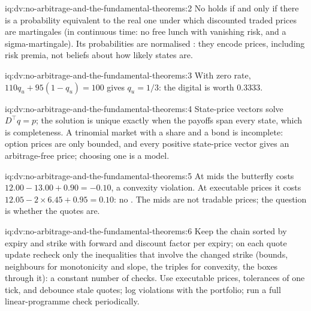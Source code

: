 \begin{solution}{iq:dv:no-arbitrage-and-the-fundamental-theorems:2}
No  holds if and only if there is a probability equivalent to the real one
under which discounted traded prices are martingales (in continuous time: no free
lunch with vanishing risk, and a sigma-martingale). Its probabilities are
normalised : they encode prices, including risk premia, not beliefs
about how likely states are.
\end{solution}

\begin{solution}{iq:dv:no-arbitrage-and-the-fundamental-theorems:3}
With zero rate, $110q_u+95(1-q_u)=100$ gives $q_u=1/3$: the digital is worth 0.3333.
\end{solution}

\begin{solution}{iq:dv:no-arbitrage-and-the-fundamental-theorems:4}
State-price vectors solve $D^\top q=p$; the solution is unique exactly when the
payoffs span every state, which is completeness. A trinomial market with a share
and a bond is incomplete: option prices are only bounded, and every positive
state-price vector gives an arbitrage-free price; choosing one is a model.
\end{solution}

\begin{solution}{iq:dv:no-arbitrage-and-the-fundamental-theorems:5}
At mids the butterfly costs $12.00-13.00+0.90=-0.10$, a convexity violation. At
executable prices it costs $12.05-2\times6.45+0.95=0.10$: no . The
mids are not tradable prices; the question is whether the quotes are.
\end{solution}

\begin{solution}{iq:dv:no-arbitrage-and-the-fundamental-theorems:6}
Keep the chain sorted by expiry and strike with forward and discount factor per
expiry; on each quote update recheck only the inequalities that involve the
changed strike (bounds, neighbours for monotonicity and slope, the triples for
convexity, the boxes through it): a constant number of checks. Use executable
prices, tolerances of one tick, and debounce stale quotes; log violations with
the portfolio; run a full linear-programme check periodically.
\end{solution}
